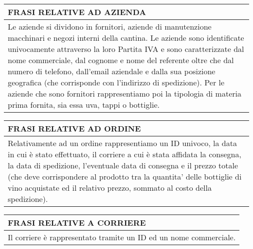 \begin{center}
	\begin{tabular}{P{16cm}}
		\toprule
		 \textbf {\large {FRASI RELATIVE AD AZIENDA}}                                                                                                                                                                                                                                                                                                                                                                                                                                                        \\
		\midrule
		Le aziende si dividono in fornitori, aziende di manutenzione macchinari e negozi interni della cantina. Le aziende sono identificate univocamente attraverso la loro Partita IVA e sono caratterizzate dal nome commerciale, dal cognome e nome del referente oltre che dal numero di telefono, dall'email aziendale e dalla sua posizione geografica (che corrisponde con l'indirizzo di spedizione). Per le aziende che sono fornitori rappresentiamo poi la tipologia di materia prima fornita, sia essa uva, tappi o bottiglie. \\
		\bottomrule
	\end{tabular}

	\vspace{0.5cm}

	\begin{tabular}{P{16cm}}
		\toprule
		 \textbf {\large {FRASI RELATIVE AD ORDINE}}                                                                                                                                                                                                                                                                                          \\
		\midrule
		Relativamente ad un ordine rappresentiamo un ID univoco, la data in cui è stato effettuato, il corriere a cui è stata affidata la consegna, la data di spedizione, l'eventuale data di consegna e il prezzo totale (che deve corrispondere al prodotto tra la quantita' delle bottiglie di vino acquistate ed il relativo prezzo, sommato al costo della spedizione). \\
		\bottomrule
	\end{tabular}

	\vspace{0.5cm}

	\begin{tabular}{P{16cm}}
		\toprule
		 \textbf {\large {FRASI RELATIVE A CORRIERE}} \\
		\midrule
		Il corriere è rappresentato tramite un ID ed un nome commerciale.             \\
		\bottomrule
	\end{tabular}


\end{center}
